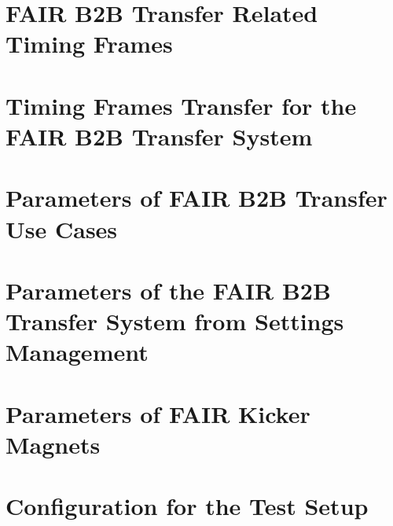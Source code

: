 \documentclass[12pt,twoside]{report}
\renewcommand{\_}{%
  \textunderscore\hspace{0pt}%
}
\begin{document}
\printnoidxglossary[type=termslist,style=long]
\printnoidxglossary[type=abbreslist,style=long]
\printnoidxglossary[type=symbolslist,style=long]


\chapter{FAIR B2B Transfer Related Timing Frames}


\chapter{Timing Frames Transfer for the FAIR B2B Transfer System}


\chapter{Parameters of FAIR B2B Transfer Use Cases}

\chapter{Parameters of the FAIR B2B Transfer System from Settings Management}

\chapter{Parameters of FAIR Kicker Magnets}

\chapter{Configuration for the Test Setup}




\sloppy
% 
%





{}
\listoffigures %
{}
\listoftables %
\end{document}
